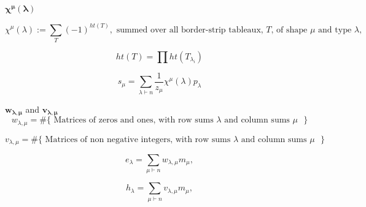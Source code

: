 \documentclass[12pt]{amsart}
\begin{document}
\begin{mdframed}[linecolor=red!20,linewidth=3pt,innertopmargin=8pt]
	$\bm{\chi^{\mu}(\lambda)}$
	\begin{minipage}[t]{19.25cm}
		\begin{equation}\chi^{\mu}(\lambda):=\sum_T(-1)^{ht(T)},\text{ summed over all border-strip tableaux, $T$, of shape $\mu$ and type $\lambda$},
		\end{equation}
	\end{minipage}
	\begin{minipage}[t]{7cm}
		\begin{equation} ht(T)=\prod ht(T_{\lambda_i})
		\end{equation}
	\end{minipage}
	\begin{minipage}[t]{6cm}
		\begin{bf}\end{bf}
		\begin{equation}s_\mu=\sum_{\lambda\vdash n} \frac{1}{z_\mu}\chi^\mu(\lambda)p_\lambda
		\end{equation}
	\end{minipage}

 \end{mdframed}
\vspace{-10pt}

\begin{mdframed}[linecolor=cyan!20,linewidth=3pt,innertopmargin=8pt]
	 $\bm{w_{\lambda,\mu}}$ and $\bm{v_{\lambda,\mu}}$
	 \begin{equation}w_{\lambda,\mu}=\#\{\text{ Matrices of zeros and ones, with row sums $\lambda$ and column sums $\mu$ }\}
	  \end{equation}
	  \begin{minipage}[t]{19.25cm}
		  \begin{equation}v_{\lambda,\mu} =\#\{ \text{ Matrices of non negative integers, with row sums $\lambda$ and column sums $\mu$ }\}
		  \end{equation}
	  \end{minipage}
	\begin{minipage}[t]{7cm}
		\begin{equation} e_\lambda=\sum_{\mu\vdash n}w_{\lambda,\mu}m_\mu,
		\end{equation}
	\end{minipage}
	\begin{minipage}[t]{7cm}
		\begin{equation} h_\lambda=\sum_{\mu\vdash n}v_{\lambda,\mu}m_\mu,
		\end{equation}
	\end{minipage}

\end{mdframed}
\vspace{-10pt}
\end{document}
